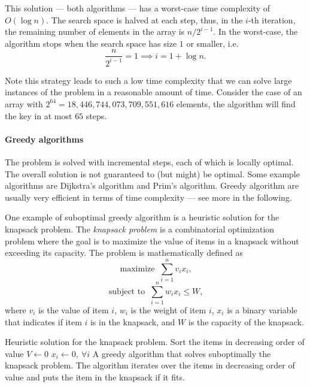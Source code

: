 
This solution --- both algorithms --- has a worst-case time complexity of $O(\log n)$. The
search space is halved at each step, thus, in the $i$-th iteration, the remaining number
of elements in the array is $n / 2^{i-1}$.  In the worst-case, the algorithm stops when the
search space has size $1$ or smaller, i.e.
\[
  \frac{n}{2^{i-1}} = 1 \implies
  i = 1 + \log n\text{.}
\]

Note this strategy leads to such a low time complexity that we can solve large instances
of the problem in a reasonable amount of time.  Consider the case of an array with $2^{64}
= 18{,}446{,}744{,}073{,}709{,}551{,}616$ elements, the algorithm will find the key in at most $65$
steps.

\clearpage
\paragraph{Greedy algorithms}  The problem is solved with incremental steps, each of which
is locally optimal.  The overall solution is not guaranteed to (but might) be optimal.  Some example
algorithms are Dijkstra's algorithm and Prim's algorithm.  Greedy algorithm are usually
very efficient in terms of time complexity --- see more in the following.

One example of suboptimal greedy algorithm is a heuristic solution for the knapsack problem.
The \emph{knapsack problem} is a combinatorial optimization problem where the goal is to
maximize the value of items in a knapsack without exceeding its capacity.  The problem is
mathematically defined as
\[
  \text{maximize }~\sum_{i = 1}^n v_i x_i\text{,}
\]
\[
  \text{subject to }~\sum_{i = 1}^n w_i x_i \leq W\text{,}
\]
where $v_i$ is the value of item $i$, $w_i$ is the weight of item $i$, $x_i$ is a binary
variable that indicates if item $i$ is in the knapsack, and $W$ is the capacity of the
knapsack.

\begin{algobox}[label=alg:knapsack]{Heuristic solution for the knapsack problem.}
  Sort the items in decreasing order of value\;
  $V \gets 0$\;
  $x_i \gets 0,~\forall i$\;
  \tcblower
  A greedy algorithm that solves suboptimally the knapsack problem.  The algorithm iterates over
  the items in decreasing order of value and puts the item in the knapsack if it fits.
\end{algobox}

